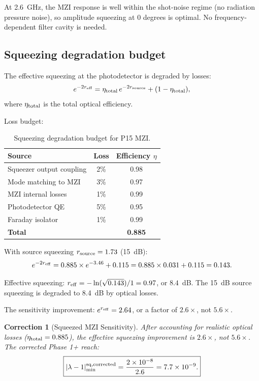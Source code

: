 \documentclass[11pt]{article}
\newtheorem{correction}{Correction}
\newcommand{\ee}[1]{\times 10^{#1}}
\newcommand{\lam}{\lambda}
\begin{document}
At 2.6~GHz, the MZI response is well within the shot-noise regime
(no radiation pressure noise), so amplitude squeezing at 0 degrees
is optimal. No frequency-dependent filter cavity is needed.

\subsection{Squeezing degradation budget}

The effective squeezing at the photodetector is degraded by losses:
\begin{equation}
e^{-2r_{\rm eff}} = \eta_{\rm total}\,e^{-2r_{\rm source}}
+ (1 - \eta_{\rm total}),
\end{equation}
where $\eta_{\rm total}$ is the total optical efficiency.

Loss budget:
\begin{table}[H]
\centering
\caption{Squeezing degradation budget for P15 MZI.}
\begin{tabular}{lcc}
\toprule
Source & Loss & Efficiency $\eta$ \\
\midrule
Squeezer output coupling & 2\% & 0.98 \\
Mode matching to MZI & 3\% & 0.97 \\
MZI internal losses & 1\% & 0.99 \\
Photodetector QE & 5\% & 0.95 \\
Faraday isolator & 1\% & 0.99 \\
\midrule
\textbf{Total} & & \textbf{0.885} \\
\bottomrule
\end{tabular}
\end{table}

With source squeezing $r_{\rm source} = 1.73$ (15~dB):
\begin{equation}
e^{-2r_{\rm eff}} = 0.885 \times e^{-3.46} + 0.115
= 0.885 \times 0.031 + 0.115 = 0.143.
\end{equation}

Effective squeezing: $r_{\rm eff} = -\ln(\sqrt{0.143})/1 = 0.97$,
or $8.4$~dB. The 15~dB source squeezing is degraded to 8.4~dB
by optical losses.

The sensitivity improvement: $e^{r_{\rm eff}} = 2.64$, or a factor
of $2.6\times$, not $5.6\times$.

\begin{correction}[Squeezed MZI Sensitivity]
After accounting for realistic optical losses
($\eta_{\rm total} = 0.885$), the effective squeezing improvement
is $2.6\times$, not $5.6\times$. The corrected Phase 1+ reach:
\begin{equation}
\boxed{|\lam-1|_{\rm min}^{\rm sq, corrected}
= \frac{2\ee{-8}}{2.6} = 7.7\ee{-9}.}
\end{equation}
\end{correction}
\end{document}
